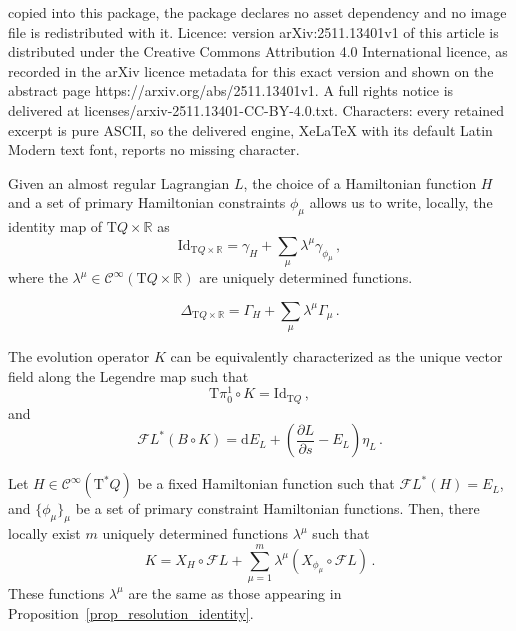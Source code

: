 \documentclass[10pt,a4paper]{amsart}
\def\FL{\mathcal{F} L}
\def\Tan{\mathrm{T}}
\newcommand{\Cinfty}{\mathscr{C}^\infty}
\newcommand{\Id}{\mathrm{Id}}
\newcommand{\R}{\mathbb{R}}
\newcommand{\parder}[2]{\frac{\partial #1}{\partial #2}}
\renewcommand{\d}{\mathrm{d}}
\begin{document}
copied into this package, the package declares no asset dependency and no image file is redistributed with it. Licence: version arXiv:2511.13401v1 of this article is distributed under the Creative Commons Attribution 4.0 International licence, as recorded in the arXiv licence metadata for this exact version and shown on the abstract page https://arxiv.org/abs/2511.13401v1. A full rights notice is delivered at licenses/arxiv-2511.13401-CC-BY-4.0.txt. Characters: every retained excerpt is pure ASCII, so the delivered engine, XeLaTeX with its default Latin Modern text font, reports no missing character.
\begin{proposition}\label{prop_resolution_identity}
    Given an almost regular Lagrangian $L$, the choice of a Hamiltonian function $H$ and a set of primary Hamiltonian constraints $\phi_{\mu}$ allows us to write, locally, the identity map of $\Tan Q \times \R$ as
    \begin{equation} \label{resolution_identity}
        \Id _{\Tan Q \times \R} = \gamma_H +  \sum_{\mu}\lambda^{\mu} \gamma_{\phi_{\mu}}\,,
    \end{equation}
    where the $\lambda^{\mu} \in \Cinfty (\Tan Q\times \R)$ are uniquely determined functions.
\end{proposition}

\begin{equation}\label{resolution_liouville}
    \Delta_{\Tan Q \times \R} = \Gamma_H + \sum_{\mu} \lambda^\mu \Gamma_{\mu}\,.
\end{equation}

\begin{proposition}
    The evolution operator $K$ can be equivalently characterized as the unique vector field along the Legendre map such that
    \begin{equation}
        \Tan \pi_0^1 \circ K = \mathrm{Id}_{\Tan Q} \,,
    \end{equation}
    and
    \begin{equation} \label{K_formula_def}
        \FL^*(B \circ K) = \d E_L + \left( \parder{L}{s} - E_L\right) \eta_L\,.
    \end{equation}
\end{proposition}

\begin{proposition} \label{K_XH_expression}
	Let $H\in \Cinfty (\Tan^*Q)$ be a fixed Hamiltonian function such that $\FL^*(H)=E_L$, and $\{\phi_{\mu}\}_{\mu}$ be a set of primary constraint Hamiltonian functions. Then, there locally exist $m$ uniquely determined functions $\lambda^{\mu}$ such that
	\begin{equation}
		K = X_H \circ \FL + \sum_{\mu= 1}^m \lambda^{\mu} (X_{\phi_\mu} \circ \FL)\,.
	\end{equation}
    These functions $\lambda^{\mu}$ are the same as those appearing in Proposition~\ref{prop_resolution_identity}.
\end{proposition}
\end{document}
